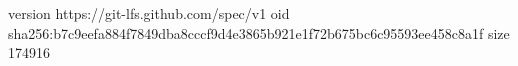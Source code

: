 version https://git-lfs.github.com/spec/v1
oid sha256:b7c9eefa884f7849dba8cccf9d4e3865b921e1f72b675bc6c95593ee458c8a1f
size 174916
